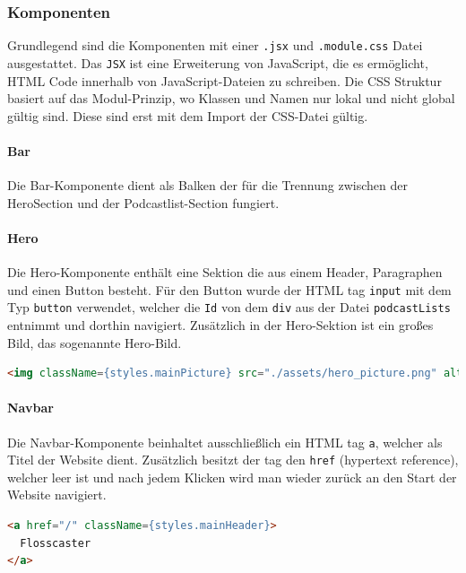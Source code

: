 \documentclass{article}
\begin{document}
\subsubsection{Komponenten}
Grundlegend sind die Komponenten mit einer \texttt{.jsx} und \texttt{.module.css} Datei ausgestattet. Das \texttt{JSX} ist eine Erweiterung von JavaScript, die es ermöglicht, HTML Code innerhalb von JavaScript-Dateien zu schreiben. Die CSS Struktur basiert auf das Modul-Prinzip, wo Klassen und Namen nur lokal und nicht global gültig sind. Diese sind erst mit dem Import der CSS-Datei gültig.

\paragraph{Bar}
Die Bar-Komponente dient als Balken der für die Trennung zwischen der HeroSection und der Podcastlist-Section fungiert.

\paragraph{Hero}
Die Hero-Komponente enthält eine Sektion die aus einem Header, Paragraphen und einen Button besteht. Für den Button wurde der HTML tag \texttt{input} mit dem Typ \texttt{button} verwendet, welcher die \texttt{Id} von dem \texttt{div} aus der Datei \texttt{podcastLists} entnimmt und dorthin navigiert. Zusätzlich in der Hero-Sektion ist ein großes Bild, das sogenannte Hero-Bild.

\begin{lstlisting}[label=lst:frontend-hero-image, language=html, caption=Implementation des Hero-Bilds]
<img className={styles.mainPicture} src="./assets/hero_picture.png" alt="Hero Section"/>
\end{lstlisting}

\paragraph{Navbar}
Die Navbar-Komponente beinhaltet ausschließlich ein HTML tag \texttt{a}, welcher als Titel der Website dient. Zusätzlich besitzt der tag den \texttt{href} (hypertext reference), welcher leer ist und nach jedem Klicken wird man wieder zurück an den Start der Website navigiert.

\begin{lstlisting}[label=lst:frontend-navbar, language=html, caption=Implementation der Navbar]
<a href="/" className={styles.mainHeader}>
  Flosscaster
</a>
\end{lstlisting}
\end{document}
